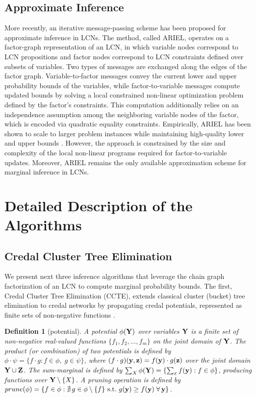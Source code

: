 \documentclass{article}
\newtheorem{definition}{Definition}
\begin{document}
\subsection{Approximate Inference} 
More recently, an iterative message‑passing scheme has been proposed for approximate inference in LCNs. The method, called ARIEL, operates on a factor‑graph representation of an LCN, in which variable nodes correspond to LCN propositions and factor nodes correspond to LCN constraints defined over subsets of variables. Two types of messages are exchanged along the edges of the factor graph. Variable‑to‑factor messages convey the current lower and upper probability bounds of the variables, while factor‑to‑variable messages compute updated bounds by solving a local constrained non‑linear optimization problem defined by the factor’s constraints. This computation additionally relies on an independence assumption among the neighboring variable nodes of the factor, which is encoded via quadratic equality constraints. Empirically, ARIEL has been shown to scale to larger problem instances while maintaining high‑quality lower and upper bounds \cite{marinescu2023lcn}. However, the approach is constrained by the size and complexity of the local non‑linear programs required for factor‑to‑variable updates. Moreover, ARIEL remains the only available approximation scheme for marginal inference in LCNs.

\section{Detailed Description of the Algorithms}

\subsection{Credal Cluster Tree Elimination}
We present next three inference algorithms that leverage the chain graph factorization of an LCN to compute marginal probability bounds. The first, Credal Cluster Tree Elimination (CCTE), extends classical cluster (bucket) tree elimination \cite{spiegelhalter88,dechter-bucket,kask05} to credal networks by propagating credal potentials, represented as finite sets of non‑negative functions \cite{maua2020ijar}.


\begin{definition}[potential]
A \emph{potential} $\phi(\mathbf{Y})$ over variables $\mathbf{Y}$ is a finite set of non-negative real-valued functions $\{f_1, f_2, \dots, f_m\}$ on the joint domain of $\mathbf{Y}$. The \emph{product} (or combination) of two potentials is defined by $\phi \cdot \psi = \{f \cdot g : f \in \phi, \; g \in \psi\}$, where $(f \cdot g)(\mathbf{y}, \mathbf{z}) = f(\mathbf{y}) \cdot g(\mathbf{z})$ over the joint domain $\mathbf{Y} \cup \mathbf{Z}$. The \emph{sum-marginal} is defined by $\sum_{X} \phi(\mathbf{Y}) = \{ \sum_{x} f(\mathbf{y}) : f \in \phi \}$, producing functions over $\mathbf{Y} \setminus \{X\}$. A \emph{pruning} operation is defined by $prune(\phi) = \{f \in \phi : \nexists\, g \in \phi \setminus \{f\} \text{ s.t.\ } g(\mathbf{y}) \geq f(\mathbf{y})\; \forall\, \mathbf{y}\}$. 
\end{definition}
\end{document}
